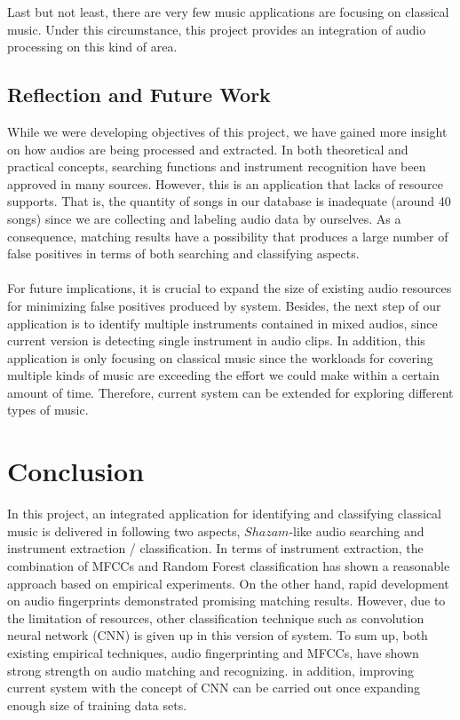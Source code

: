 \documentclass[whitelogo,12pt]{tudelft-report}
\begin{document}
Last but not least, there are very few music applications are focusing on  classical music. Under this circumstance, this project provides an integration of audio processing  on this kind of area.

\section{Reflection and Future Work}
While we were developing objectives of this project, we have gained more insight on how audios are being processed and extracted. In both theoretical and practical concepts, searching functions and instrument recognition have been approved in many sources. However, this is an application that lacks of resource supports. That is, the quantity of songs in our database is inadequate (around 40 songs) since we are collecting and labeling audio data by ourselves. As a consequence, matching results have a possibility that produces a large number of false positives in terms of both searching and classifying aspects. \\
\\
For future implications, it is crucial to expand the size of existing audio resources for minimizing false positives produced by system. Besides, the next step of our application is to identify multiple instruments contained in  mixed audios, since current version is detecting single instrument in audio clips.  In addition, this application is only focusing on classical music since the workloads for covering multiple kinds of music are exceeding the effort we could make within a certain amount of time. Therefore, current system can be extended for exploring different types of music.


\chapter{Conclusion}
In this project, an integrated application for identifying and classifying classical music is delivered in following two aspects, $Shazam$-like audio searching and instrument extraction / classification. In terms of instrument extraction, the combination of MFCCs and Random Forest classification has shown a reasonable approach based on empirical experiments. On the other hand, rapid development on audio fingerprints demonstrated promising matching results. However, due to the limitation of resources, other classification technique such as convolution neural network (CNN) is given up in this version of system. To sum up, both existing empirical techniques, audio fingerprinting and MFCCs, have shown strong strength on audio matching and recognizing. in addition, improving current system with the concept of CNN can be carried out once expanding enough size of training data sets.




\appendix
%


\end{document}
